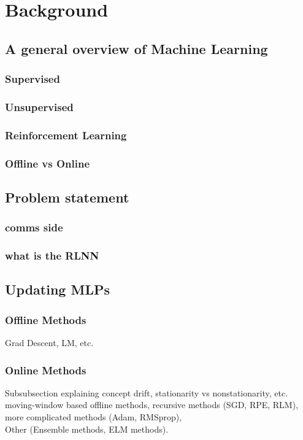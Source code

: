\chapter{Background}
\section{A general overview of Machine Learning}
\subsection{Supervised} 
\subsection{Unsupervised}
\subsection{Reinforcement Learning}
\subsection{Offline vs Online}


\section{Problem statement}
\subsection{comms side}
\subsection{ what is the RLNN}

\section{Updating MLPs}
\subsection{Offline Methods}
Grad Descent, LM, etc.
\subsection{Online Methods}
Subsubsection explaining concept drift, stationarity vs nonstationarity, etc. \\
moving-window based offline methods, recursive methods (SGD, RPE, RLM),\\
more complicated methods (Adam, RMSprop), \\
Other (Ensemble methods, ELM methods).

